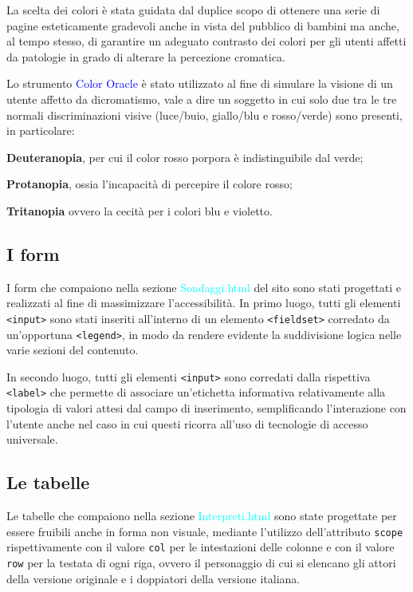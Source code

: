 \documentclass[10pt,a4paper,onecolumn]{article}
\newcommand{\sitepage}[1]{\textcolor{cyan}{\textsf{#1}}}
\newcommand{\progname}[1]{\textcolor{blue}{\textsf{#1}}}
\begin{document}
La scelta dei colori è stata guidata dal duplice scopo di ottenere una serie di pagine esteticamente gradevoli anche in vista del pubblico di bambini ma anche, al tempo stesso, di garantire un adeguato contrasto dei colori per gli utenti affetti da patologie in grado di alterare la percezione cromatica.

Lo strumento \progname{Color Oracle} è stato utilizzato al fine di simulare la visione di un utente affetto da dicromatismo, vale a dire un soggetto in cui solo due tra le tre normali discriminazioni visive (luce/buio, giallo/blu e rosso/verde) sono presenti, in particolare:
\begin{description}
  \item{\textbf{Deuteranopia}}, per cui il color rosso porpora è indistinguibile dal verde;
  \item{\textbf{Protanopia}}, ossia l'incapacità di percepire il colore rosso;
  \item{\textbf{Tritanopia}} ovvero la cecità per i colori blu e violetto.
\end{description}


\subsection{I form}
I form che compaiono nella sezione \sitepage{Sondaggi.html} del sito sono stati progettati e realizzati al fine di massimizzare l'accessibilità. In primo luogo, tutti gli elementi \texttt{<input>} sono stati inseriti all'interno di un elemento \texttt{<fieldset>} corredato da un'opportuna \texttt{<legend>}, in modo da rendere evidente la suddivisione logica nelle varie sezioni del contenuto.

In secondo luogo, tutti gli elementi \texttt{<input>} sono corredati dalla rispettiva \texttt{<label>} che permette di associare un'etichetta informativa relativamente alla tipologia di valori attesi dal campo di inserimento, semplificando l'interazione con l'utente anche nel caso in cui questi ricorra all'uso di tecnologie di accesso universale.


\subsection{Le tabelle}
Le tabelle che compaiono nella sezione \sitepage{Interpreti.html} sono state progettate per essere fruibili anche in forma non visuale, mediante l'utilizzo dell'attributo \texttt{scope} rispettivamente con il valore \texttt{col} per le intestazioni delle colonne e con il valore \texttt{row} per la testata di ogni riga, ovvero il personaggio di cui si elencano gli attori della versione originale e i doppiatori della versione italiana.
\end{document}
